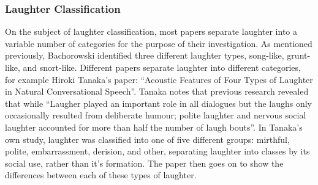 \documentclass[a4paper,11pt,notitlepage]{article}
\begin{document}
\subsubsection{Laughter Classification}
On the subject of laughter classification, most papers separate laughter into a variable number of categories for the purpose of their investigation. As mentioned previously, Bachorowski identified three different laughter types, song-like, grunt-like, and snort-like. Different papers separate laughter into different categories, for example Hiroki Tanaka's paper: ``Acoustic Features of Four Types of Laughter in Natural Conversational Speech''.\cite{tanaka2011acoustic} Tanaka notes that previous research revealed that while ``Laugher played an important role in all dialogues but the laughs only occasionally resulted from deliberate humour; polite laughter and nervous social laughter accounted for more than half the number of laugh bouts''\cite{campbell2007changes}. In Tanaka's own study, laughter was classified into one of five different groups: mirthful, polite, embarrassment, derision, and other, separating laughter into classes by its social use, rather than it's formation. The paper then goes on to show the differences between each of these types of laughter.\\
\\
\end{document}
